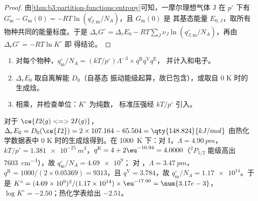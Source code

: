 \begin{proof}
由\cref{thm:b3:partition-functions:entropy}可知，一摩尔理想气体 $\mathrm J$ 在 $p^\circ$ 下有
$G^\circ_{\mathrm m} - G_{\mathrm m}(0) = -RT\ln(q^\circ_{J,\mathrm m}/N_A)$，且 $G_{\mathrm m}(0)$ 是
其基态能量 $E_{0,J}$，取所有物种共同的能量标度。于是 $\Delta_rG^\circ =
\Delta_rE_0 - RT\sum_J\nu_J\ln(q^\circ_{J,\mathrm m}/N_A)$，再由 $\Delta_rG^\circ = -RT\ln K^\circ$ 即
得结论。
\end{proof}

\begin{method}[由光谱数据计算平衡常数]\label{met:b3:statistical-thermo-applied:k-stat}
\begin{enumerate}
  \item 对每个物种，$q^\circ_{\mathrm m}/N_A = (kT/p^\circ)\Lambda^{-3}\times q^{\mathrm R}q^{\mathrm V}q^{\mathrm E}$，
        并计入和电子。
  \item $\Delta_rE_0$ 取自离解能 $D_0$（自基态
        振动能级起算，故已包含），或取自
        0 K 时的生成焓。
  \item 相乘，并检查单位：$K^\circ$ 为纯数，
        标准压强经 $kT/p^\circ$ 引入。
\end{enumerate}
\end{method}

\begin{example}[碘的离解]\label{ex:b3:statistical-thermo-applied:iodine}
对于 $\ce{I2(g) <=> 2 I(g)}$，$\Delta_rE_0 = D_0(\ce{I2}) = 2 \times 107.164 - 65.504 = \qty{148.824}{kJ/mol}$
由热化学数据表中 0 K 时的生成焓得到。在
\qty{1000}{K} 下：对 I，$\Lambda = \qty{4.90}{pm}$，$kT/p^\circ = \qty{1.381e-25}{m^3}$，$q^{\mathrm E} = 4 +
2\eu^{-10.94} = 4.0000$（${}^2P_{1/2}$ 能级高出 \qty{7603}{cm^{-1}}），故 $q^\circ_{\mathrm m}/N_A = \num{4.69e9}$；
对 ，$\Lambda = \qty{3.47}{pm}$，$q^{\mathrm R} = 1000/(2 \times 0.05369) = 9313$，且 $q^{\mathrm V} = 3.784$，故
$q^\circ_{\mathrm m}/N_A = \num{1.17e14}$。于是 $K^\circ = (4.69\times10^9)^2/(1.17\times10^{14}) \times \eu^{-17.90} =
\num{3.17e-3}$，$\log K^\circ = -2.50$；热化学表给出 $-2.51$。
\end{example}

